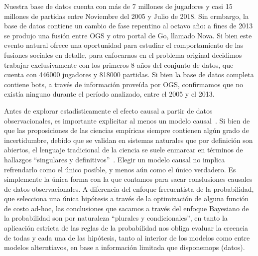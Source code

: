 \documentclass[a4paper,11pt]{book}
\theoremstyle{definition}
\begin{document}
Nuestra base de datos cuenta con más de 7 millones de jugadores y casi 15 millones de partidas entre Noviembre del 2005 y Julio de 2018.
%
Sin ermbargo, la base de datos contiene un cambio de fase repentino al octavo año: a fines de 2013 se produjo una fusi\'on entre OGS y otro portal de Go, llamado Nova.
%
Si bien este evento natural ofrece una oportunidad para estudiar el comportamiento de las fusiones sociales en detalle, para enfocarnos en el problema original decidimos trabajar exclusivamente con los primeros 8 años del conjunto de datos, que cuenta con {446000} jugadores y {818000} partidas.
%
Si bien la base de datos completa contiene bots, a través de información proveída por OGS, confirmamos que no existía ninguno durante el período analizado, entre el 2005 y el 2013.

Antes de explorar estadísticamente el efecto causal a partir de datos observacionales, es importante explicitar al menos un modelo causal~\cite{pearl2009-causality}.
%
Si bien de que las proposiciones de las ciencias empíricas siempre contienen algún grado de incertidumbre, debido que se validan en sistemas naturales que por definición son abiertos, el lenguaje tradicional de la ciencia se suele enmarcar en términos de hallazgos ``singulares y definitivos''~\cite{stirling2010-keepItComplex, smaldino2016-badScience, shepherd2021-statisticalPractice}.
%
Elegir un modelo causal no implica refrendarlo como el único posible, y menos aún como el único verdadero.
%
Es simplemente la única forma con la que contamos para sacar conslusiones causales de datos observacionales.
%
A diferencia del enfoque frecuentista de la probabilidad, que selecciona una única hipótesis a través de la optimización de alguna función de costo ad-hoc, las conclusiones que sacamos a través del enfoque Bayesiano de la probabilidad son por naturaleza ``plurales y condicionales'', en tanto la aplicación estricta de las reglas de la probabilidad nos obliga evaluar la creencia de todas y cada una de las hipótesis, tanto al interior de los modelos como entre modelos alterntiavos, en base a información limitada que disponemops (datos).
\end{document}
